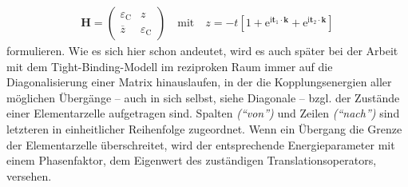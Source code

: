 \documentclass[a4paper, 10pt, twoside, openany]{book} %
\newcommand \bracks[1]{\left [ #1 \right ]}
\def \I {\mathrm i}
\def \E {\mathrm e}
\def \vec {\boldsymbol}
\newcommand \mat[1]{\begin{pmatrix} #1 \end{pmatrix}}
\def \eC {\varepsilon_\mathrm{C}}
\begin{document}
%
\begin{align}
    \vec H = \mat{\eC & z \\ \overline z & \eC} \quad \text{mit} \quad z = -t \bracks{1 + \E^{\I \vec t_1 \cdot \vec k} + \E^{\I \vec t_2 \cdot \vec k}}
    \label{Energiematrix Graphen}
\end{align}
%
formulieren. Wie es sich hier schon andeutet, wird es auch später bei der Arbeit mit dem Tight-Binding-Modell im reziproken Raum immer auf die Diagonalisierung einer Matrix hinauslaufen, in der die Kopplungsenergien aller möglichen Übergänge -- auch in sich selbst, siehe Diagonale -- bzgl. der Zustände einer Elementarzelle aufgetragen sind. Spalten \emph{("`von"')} und Zeilen \emph{("`nach"')} sind letzteren in einheitlicher Reihenfolge zugeordnet. Wenn ein Übergang die Grenze der Elementarzelle überschreitet, wird der entsprechende Energieparameter mit einem Phasenfaktor, dem Eigenwert des zuständigen Translationsoperators, versehen.
\end{document}
